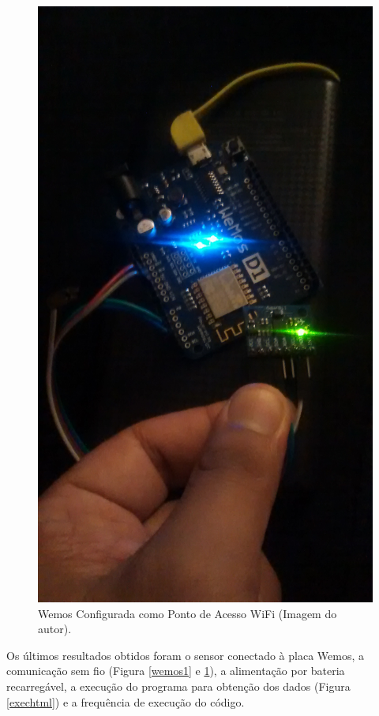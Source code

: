 	\begin{figure}[h!]
		\centering
		\includegraphics[keepaspectratio=true,scale=0.075]{figuras/wemos2.jpg}
		\caption{Wemos Configurada como Ponto de Acesso WiFi (Imagem do autor).}
	 
		\label{wemos2}	
	\end{figure}
	
	Os últimos resultados obtidos foram o sensor conectado à placa Wemos, a comunicação sem fio (Figura \ref{wemos1} e \ref{wemos2}), a alimentação por bateria recarregável, a execução do programa para obtenção dos dados (Figura \ref{exechtml}) e a frequência de execução do código.
	
